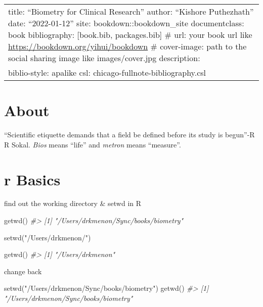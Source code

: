 \documentclass[
]{article}
\author{}
\date{\vspace{-2.5em}}
\newenvironment{Shaded}{\begin{snugshade}}{\end{snugshade}}
\newcommand{\CommentTok}[1]{\textcolor[rgb]{0.56,0.35,0.01}{\textit{#1}}}
\newcommand{\FunctionTok}[1]{\textcolor[rgb]{0.00,0.00,0.00}{#1}}
\newcommand{\NormalTok}[1]{#1}
\newcommand{\StringTok}[1]{\textcolor[rgb]{0.31,0.60,0.02}{#1}}
\begin{document}
{
\setcounter{tocdepth}{2}
\tableofcontents
}
\begin{longtable}[]{@{}
  >{\raggedright\arraybackslash}p{}@{}}
\toprule
\endhead
title: ``Biometry for Clinical Research''
author: ``Kishore Puthezhath''
date: ``2022-01-12''
site: bookdown::bookdown\_site
documentclass: book
bibliography: {[}book.bib, packages.bib{]}
\# url: your book url like \url{https://bookdown.org/yihui/bookdown}
\# cover-image: path to the social sharing image like images/cover.jpg
description: \textbar{} \\
biblio-style: apalike
csl: chicago-fullnote-bibliography.csl \\
\bottomrule
\end{longtable}

\hypertarget{about}{%
\section{About}\label{about}}

``Scientific etiquette demands that a field be defined before its study is begun''-R R Sokal. \emph{Bios} means ``life'' and \emph{metron} means ``measure''.

\hypertarget{r-basics}{%
\section{r Basics}\label{r-basics}}

find out the working directory \& setwd in R

\begin{Shaded}
\begin{Highlighting}[]
  
\FunctionTok{getwd}\NormalTok{()}
\CommentTok{\#\textgreater{} [1] "/Users/drkmenon/Sync/books/biometry"}
  

\FunctionTok{setwd}\NormalTok{(}\StringTok{"/Users/drkmenon/"}\NormalTok{)}

\FunctionTok{getwd}\NormalTok{()}
\CommentTok{\#\textgreater{} [1] "/Users/drkmenon"}
\end{Highlighting}
\end{Shaded}

change back

\begin{Shaded}
\begin{Highlighting}[]
\FunctionTok{setwd}\NormalTok{(}\StringTok{"/Users/drkmenon/Sync/books/biometry"}\NormalTok{)}
\FunctionTok{getwd}\NormalTok{()}
\CommentTok{\#\textgreater{} [1] "/Users/drkmenon/Sync/books/biometry"}
\end{Highlighting}
\end{Shaded}
\end{document}

